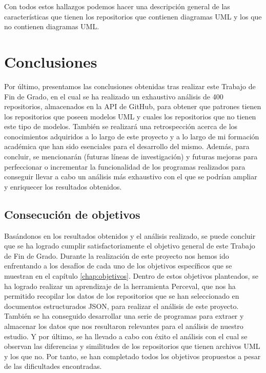 \documentclass[a4paper, 12pt]{book}
\begin{document}
Con todos estos hallazgos podemos hacer una descripción general de las características que tienen los repositorios que contienen diagramas UML y los que no contienen diagramas UML.


\cleardoublepage
\chapter{Conclusiones}
\label{chap:conclusiones}

Por último, presentamos las conclusiones obtenidas tras realizar este Trabajo de Fin de Grado, en el cual se ha realizado un exhaustivo análisis de 400 repositorios, almacenados en la API de GitHub, para obtener que patrones tienen los repositorios que poseen modelos UML y cuales los repositorios que no tienen este tipo de modelos. 
También se realizará una retrospección acerca de los conocimientos adquiridos a lo largo de este proyecto y a lo largo de mi formación académica que han sido esenciales para el desarrollo del mismo.
Además, para concluir, se mencionarán (futuras líneas de investigación) y futuras mejoras para perfeccionar o incrementar la funcionalidad de los programas realizados para conseguir llevar a cabo un análisis más exhaustivo con el que se podrían ampliar y enriquecer los resultados obtenidos.


\section{Consecución de objetivos}
\label{sec:consecucion-objetivos}

Basándonos en los resultados obtenidos y el análisis realizado, se puede concluir que se ha logrado cumplir satisfactoriamente el objetivo general de este Trabajo de Fin de Grado.
Durante la realización de este proyecto nos hemos ido enfrentando a los desafíos de cada uno de los objetivos específicos que se muestran en el capítulo \ref{chap:objetivos}.
Dentro de estos objetivos planteados, se ha logrado realizar un aprendizaje de la herramienta Perceval, que nos ha permitido recopilar los datos de los repositorios que se han seleccionado en documentos estructurados JSON, para realizar el análisis de este proyecto. 
También se ha conseguido desarrollar una serie de programas para extraer y almacenar los datos que nos resultaron relevantes para el análisis de nuestro estudio.
Y por último, se ha llevado a cabo con éxito el análisis con el cual se observan las diferencias y similitudes de los repositorios que tienen archivos UML y los que no.
Por tanto, se han completado todos los objetivos propuestos a pesar de las dificultades encontradas.
\end{document}
